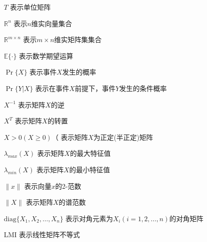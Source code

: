 \begin{denotation}
\item[$T$]  表示单位矩阵
\item[$\mathbb{R}^{n}$]  表示$n$维实向量集合
\item[$\mathbb{R}^{m\times n}$]  表示$m\times n$维实矩阵集集合
\item[$\mathbb{E}\{\cdot \}$]  表示数学期望运算
\item [$\Pr\{X\}$]  表示事件$X$发生的概率
\item [$\Pr\{Y|X\}$]  表示在事件$X$前提下，事件$Y$发生的条件概率
\item [$X^{-1}$] 表示矩阵$X$的逆
\item [$X^{T}$] 表示矩阵$X$的转置
\item [$X>0(X\geq 0)（$] 表示矩阵$X$为正定(半正定)矩阵
\item [$\lambda_{max}(X)$] 表示矩阵$X$的最大特征值
\item [$\lambda_{min}(X)$] 表示矩阵$X$的最小特征值

\item [$\|x\|$] 表示向量$x$的2-范数
\item [$\|X\|$] 表示矩阵$X$的谱范数
\item [$\mathrm{diag}\{X_1,X_2,\dots,X_n \}$]  表示对角元素为$X_i(i=1,2,\dots,n)$的对角矩阵

\item [LMI]  表示线性矩阵不等式 

\end{denotation}

